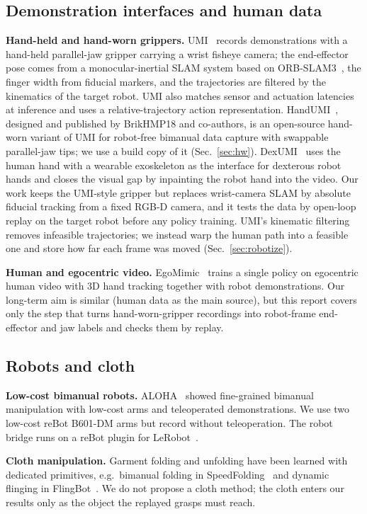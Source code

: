 \documentclass[conference,10pt]{IEEEtran}
\begin{document}
\subsection{Demonstration interfaces and human data}
\textbf{Hand-held and hand-worn grippers.} UMI~\cite{chi2024umi} records demonstrations with a hand-held parallel-jaw
gripper carrying a wrist fisheye camera; the end-effector pose comes from a monocular-inertial SLAM system based on
ORB-SLAM3~\cite{campos2021orbslam3}, the finger width from fiducial markers, and the trajectories are filtered by the
kinematics of the target robot. UMI also matches sensor and actuation latencies at inference and uses a relative-trajectory
action representation. HandUMI~\cite{handumi,meza2026handumi}, designed and published by BrikHMP18 and co-authors, is an
open-source hand-worn variant of UMI for robot-free bimanual data capture with swappable parallel-jaw tips; we use a build
copy of it (Sec.~\ref{sec:hw}). DexUMI~\cite{xu2025dexumi} uses the human hand with a wearable exoskeleton as the interface
for dexterous robot hands and closes the visual gap by inpainting the robot hand into the video. Our work keeps the
UMI-style gripper but replaces wrist-camera SLAM by absolute fiducial tracking from a fixed RGB-D camera, and it tests the
data by open-loop replay on the target robot before any policy training. UMI's kinematic filtering removes infeasible
trajectories; we instead warp the human path into a feasible one and store how far each frame was moved
(Sec.~\ref{sec:robotize}).

\textbf{Human and egocentric video.} EgoMimic~\cite{kareer2025egomimic} trains a single policy on egocentric human video
with 3D hand tracking together with robot demonstrations. Our long-term aim is similar (human data as the main source),
but this report covers only the step that turns hand-worn-gripper recordings into robot-frame end-effector and jaw labels
and checks them by replay.

\subsection{Robots and cloth}
\textbf{Low-cost bimanual robots.} ALOHA~\cite{zhao2023aloha} showed fine-grained bimanual manipulation with low-cost arms
and teleoperated demonstrations. We use two low-cost reBot B601-DM arms but record without teleoperation. The robot bridge
runs on a reBot plugin for LeRobot~\cite{cadene2024lerobot}.

\textbf{Cloth manipulation.} Garment folding and unfolding have been learned with dedicated primitives, e.g.\ bimanual
folding in SpeedFolding~\cite{avigal2022speedfolding} and dynamic flinging in FlingBot~\cite{ha2021flingbot}. We do not
propose a cloth method; the cloth enters our results only as the object the replayed grasps must reach.
\end{document}
